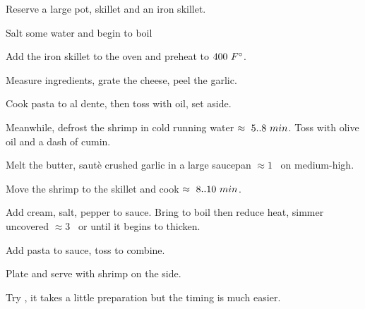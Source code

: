 \begin{preparation}
\item Reserve a large pot, skillet and an iron skillet.

\item Salt some water and begin to boil

\item Add the iron skillet to the oven and preheat to $400~\Fahrenheit$.

\item Measure ingredients, grate the cheese, peel the garlic.

\item Cook pasta to al dente, then toss with oil, set aside.

\item Meanwhile, defrost the shrimp in cold running water $\approx~5..8~\minute$.
	Toss with olive oil and a dash of cumin.

\item Melt the butter, saut\`{e} crushed garlic in a large saucepan $\approx1$ \minute~on medium-high.

\item Move the shrimp to the skillet and cook $\approx~8..10~\minute$.

\item Add cream, salt, pepper to sauce. Bring to boil then reduce heat, simmer uncovered $\approx3$ \minute~or until it begins to thicken.

\item Add pasta to sauce, toss to combine.

\item Plate and serve with shrimp on the side.
\end{preparation}

\begin{variation}
\item Try , it takes a little preparation but the timing is much easier.

\end{variation}

\recipeend%
